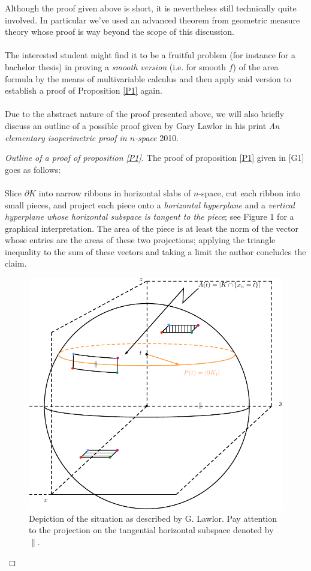 \documentclass[12pt, a4paper, titlepage]{article}
\begin{document}
Although the proof given above is short, it is nevertheless still technically quite involved. In particular we've used an advanced theorem from geometric measure theory whose proof is way beyond the scope of this discussion. 
\\\\
The interested student might find it to be a fruitful problem (for instance for a bachelor thesis) in proving a \textit{smooth version} (i.e. for smooth $f$) of the area formula by the means of multivariable calculus and then apply said version to establish a proof of Proposition \ref{P1} again. 
\\\\
Due to the abstract nature of the proof presented above, we will also briefly discuss an outline of a possible proof given by Gary Lawlor in his print \textit{An elementary isoperimetric proof in $n$-space} 2010. \newpage
\begin{proof}[Outline of a proof of proposition \ref{P1}] The proof of proposition \ref{P1} given in [G1] goes as follows: \\
\\Slice $\partial K$ into narrow ribbons in horizontal slabs of $n$-space, cut each ribbon into
small pieces, and project each piece onto a \textit{horizontal hyperplane} and a \textit{vertical hyperplane
whose horizontal subspace is tangent to the piece}; see Figure 1 for a graphical interpretation. The area of the piece is at least the
norm of the vector whose entries are the areas of these two projections; applying the
triangle inequality to the sum of these vectors and taking a limit the author concludes the claim. 
\begin{figure}[hbtp]
\centering
\includegraphics[scale=.9]{images/proof.pdf}
\caption{Depiction of the situation as described by G. Lawlor. Pay attention to the projection on the tangential horizontal subspace denoted by $\|$.}
\end{figure}
\end{proof}
\end{document}
